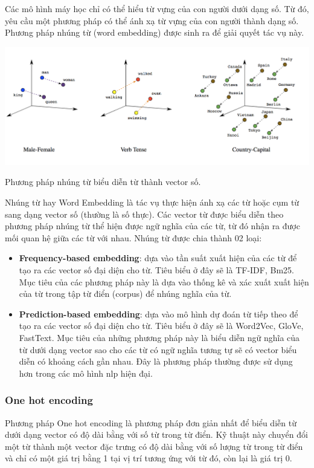 \documentclass[a4paper, 12pt, openany]{book}
\begin{document}
Các mô hình máy học chỉ có thể hiểu từ vựng của con người dưới dạng số. Từ đó, yêu cầu một phương pháp có thể
ánh xạ từ vựng của con người thành dạng số. Phương pháp nhúng từ (word embedding)
được sinh ra để giải quyết tác vụ này.

\begin{minipage}{\linewidth}
    \captionsetup{type=figure}
    \centering
    \includegraphics[width=\linewidth]{./assets/images/word_embedding.png}
    \caption{Phương pháp nhúng từ biểu diễn từ thành vector số.}
\end{minipage}
\vspace{0.5cm}

Nhúng từ hay Word Embedding là tác vụ thực hiện ánh xạ các từ hoặc cụm từ sang dạng vector
số (thường là số thực). Các vector từ được biểu diễn theo phương pháp nhúng từ thể hiện
được ngữ nghĩa của các từ, từ đó nhận ra được mối quan hệ giữa các từ với nhau. Nhúng
từ được chia thành 02 loại:


\begin{itemize}
    \item \textbf{Frequency-based embedding}: dựa vào tần suất xuất hiện của các từ để tạo ra các
    vector số đại diện cho từ. Tiêu biểu ở đây sẽ là TF-IDF, Bm25. Mục tiêu của các phương pháp này là
    dựa vào thống kê và xác xuất xuất hiện của từ trong tập từ điển (corpus) để nhúng nghĩa của từ.

    \item \textbf{Prediction-based embedding}: dựa vào mô hình dự đoán từ tiếp theo để tạo ra các
    vector số đại diện cho từ. Tiêu biểu ở đây sẽ là Word2Vec, GloVe, FastText. Mục tiêu của những
    phương pháp này là biểu diễn ngữ nghĩa của từ dưới dạng vector sao cho 
    các từ có ngữ nghĩa tương tự sẽ có vector biểu diễn có khoảng cách gần nhau. Đây là phương pháp
    thường được sử dụng hơn trong các mô hình \ac{nlp} hiện đại.
\end{itemize}

\subsubsection{One hot encoding}
Phương pháp One hot encoding là phương pháp đơn giản nhất để biểu diễn từ dưới dạng vector có độ dài bằng với số từ trong từ điển.
Kỹ thuật này chuyển đổi một từ thành một vector đặc trưng có độ
dài bằng với số lượng từ trong từ điển và chỉ có một giá trị bằng 1 tại vị trí tương ứng với
từ đó, còn lại là giá trị 0.
\end{document}
